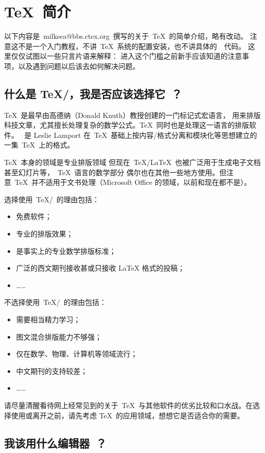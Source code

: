 \section{\TeX~简介}

以下内容是~milksea@bbs.ctex.org~撰写的关于~\TeX~的简单介绍，略有改动。
注意这不是一个入门教程，不讲~\TeX~系统的配置安装，也不讲具体的~\XeLaTeX~代码。
这里仅仅试图以一些只言片语来解释：
进入这个门槛之前新手应该知道的注意事项，以及遇到问题以后该去如何解决问题。

\subsection{什么是 \TeX/\XeLaTeX，我是否应该选择它~？}

\TeX~是最早由高德纳（Donald Knuth）教授创建的一门标记式宏语言，
用来排版科技文章，尤其擅长处理复杂的数学公式。\TeX~同时也是处理这一语言的排版软件。
\XeLaTeX~是 Leslie Lamport 在~\TeX~基础上按内容/格式分离和模块化等思想建立的一集~\TeX~上的格式。

\TeX~本身的领域是专业排版领域
但现在~TeX/LaTeX~也被广泛用于生成电子文档甚至幻灯片等，~\TeX~语言的数学部分
偶尔也在其他一些地方使用。但注意~\TeX~并不适用于文书处理（Microsoft Office 的领域，以前和现在都不是）。

选择使用~\TeX/\XeLaTeX~的理由包括：
\begin{itemize}
\item 免费软件；
\item 专业的排版效果；
\item 是事实上的专业数学排版标准；
\item 广泛的西文期刊接收甚或只接收 LaTeX 格式的投稿；
\item[] ……
\end{itemize}
不选择使用~\TeX/\XeLaTeX~的理由包括：
\begin{itemize}
\item 需要相当精力学习；
\item 图文混合排版能力不够强；
\item 仅在数学、物理、计算机等领域流行；
\item 中文期刊的支持较差；
\item[] ……
\end{itemize}

请尽量清醒看待网上经常见到的关于~\TeX~与其他软件的优劣比较和口水战。在选择使用或离开之前，请先考虑
\TeX~的应用领域，想想它是否适合你的需要。


\subsection{我该用什么编辑器~？}

